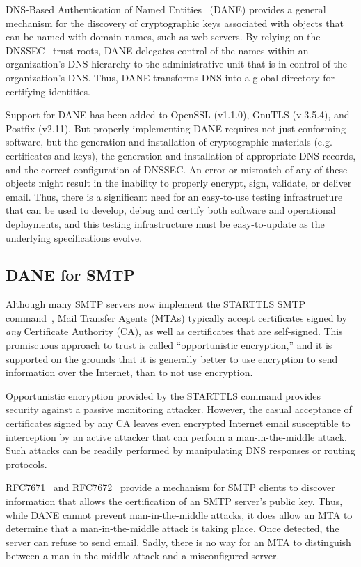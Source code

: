\documentclass[preprint,3p,11pt]{elsarticle}
\begin{document}
DNS-Based Authentication of Named Entities~\cite{rfc7671} (DANE)
provides a general mechanism for the discovery of cryptographic keys
associated with objects that can be named with 
domain names, such as web servers. By relying on the DNSSEC~\cite{rfc3833}
trust roots, DANE delegates control of the names within an
organization's DNS hierarchy to the administrative unit that is in
control of the organization's DNS. Thus, DANE transforms DNS into a
global directory for certifying identities.

Support for DANE has been added to OpenSSL (v1.1.0), GnuTLS
(v.3.5.4), and Postfix (v2.11). But properly implementing DANE requires not just conforming
software, but the generation and installation of cryptographic
materials (e.g. certificates and keys), the generation and installation of appropriate DNS
records, and the correct configuration of DNSSEC. An error or mismatch of any of these
objects might result in the inability to properly encrypt, sign,
validate, or deliver email. Thus, there is a significant need for an
easy-to-use testing infrastructure that can be used to develop, debug
and certify both software and operational deployments, and this testing infrastructure
must be easy-to-update as the underlying specifications evolve.

\subsection{DANE for SMTP}

Although many SMTP servers now implement the STARTTLS SMTP
command~\cite{rfc3207}, Mail Transfer Agents (MTAs) typically
accept certificates signed by \emph{any} Certificate Authority (CA),
as well as certificates that are self-signed. This promiscuous
approach to trust is called ``opportunistic encryption,'' and it is
supported on the grounds that it is generally better to use encryption
to send information over the Internet, than to not use encryption.

Opportunistic encryption provided by the STARTTLS command provides security
against a passive monitoring attacker. However, the casual acceptance
of certificates signed by any CA leaves even encrypted Internet email
susceptible to interception by an active attacker that can perform a
man-in-the-middle attack. Such attacks can be readily performed by
manipulating DNS responses or routing protocols.

RFC7671~\cite{rfc761} and RFC7672~\cite{rfc7672} provide a mechanism for SMTP clients to discover
information that allows the certification of an SMTP server's public
key. Thus, while DANE cannot prevent
man-in-the-middle attacks, it does  allow an MTA 
to determine that a man-in-the-middle attack is taking place. Once
detected, the server can refuse to send email. Sadly, there is no way
for an MTA to distinguish between a man-in-the-middle attack and a
misconfigured server.
\end{document}
